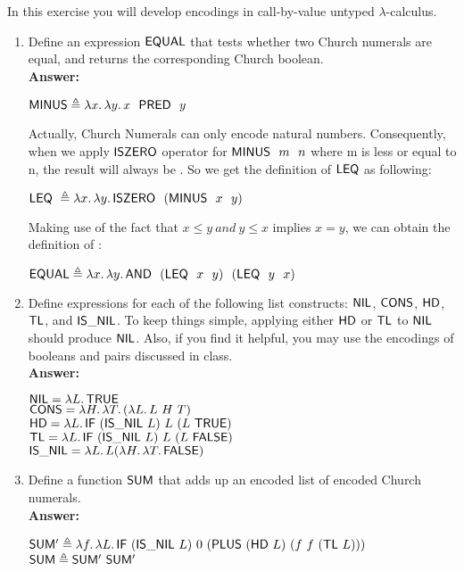 \documentclass[11pt]{article}
\begin{document}
\begin{exercise}
In this exercise you will develop encodings in call-by-value untyped
$\lambda$-calculus.
\begin{enumerate}
\item Define an expression $\mathsf{EQUAL}$ that tests whether two Church numerals 
  are equal, and returns the corresponding Church boolean.\\

\noindent \textbf{Answer:}
\begin{center}
	$\nm{MINUS} \triangleq \lam{x}{\lam{y}{x \ \ \nm{PRED} \ \ y}}$\\
\end{center}
\noindent Actually, Church Numerals can only encode natural numbers. Consequently, when we apply $\mathsf{ISZERO}$ operator for $\mathsf{MINUS} \ \ m \ \ n$ where m is less or equal to n, the result will always be . So we get the definition of $\mathsf{LEQ}$ as following:
\begin{center}
	$\mathsf{LEQ} \ \triangleq \lambda x.\,\lambda y.\,\mathsf{ISZERO} \ \ (\mathsf{MINUS} \ \ x \ \ y)$\\
\end{center}
\noindent Making use of the fact that $x \leq y \ and \ y \leq x$ implies $x = y$, we can obtain the definition of :
\begin{center}
	$\mathsf{EQUAL} \triangleq \lambda x.\,\lambda y.\,\mathsf{AND} \ \ (\mathsf{LEQ} \ \ x \ \ y) \ \ (\mathsf{LEQ} \ \ y \ \ x)$
\end{center}
\item Define expressions for each of the
  following list constructs: $\mathsf{NIL}$, $\mathsf{CONS}$, $\mathsf{HD}$,
  $\mathsf{TL}$, and $\mathsf{IS\_NIL}$. To keep things simple, applying
  either $\mathsf{HD}$ or $\mathsf{TL}$ to $\mathsf{NIL}$ should produce
  $\mathsf{NIL}$. Also, if you find it helpful, you may use the encodings
  of booleans and pairs discussed in class.\\

\noindent \textbf{Answer:}
\begin{center}
	$\mathsf{NIL} = \lambda L.\,\mathsf{TRUE}$\\
	$\mathsf{CONS} = \lambda H.\,\lambda T.\,(\lambda L.\,L~H~T)$\\
	$\mathsf{HD} = \lambda L.\,\mathsf{IF}~(\mathsf{IS\_NIL}~L)~L~(L~\mathsf{TRUE})$\\
	$\mathsf{TL} = \lambda L.\,\mathsf{IF}~(\mathsf{IS\_NIL}~L)~L~(L~\mathsf{FALSE})$\\
	$\mathsf{IS\_NIL} = \lambda L.\,L(\lambda H.\,\lambda T.\,\mathsf{FALSE})$
\end{center}
\item Define a function $\mathsf{SUM}$ that adds up an encoded list of encoded Church
  numerals.\\

\noindent \textbf{Answer:}
\begin{center}
	$\mathsf{SUM'} \triangleq \lambda f.\,\lambda L.\,\mathsf{IF}~(\mathsf{IS\_NIL}~L)~0~(\mathsf{PLUS}~(\mathsf{HD}~L)~(f~f~(\mathsf{TL}~L)))$\\
	$\mathsf{SUM} \triangleq \mathsf{SUM'}~\mathsf{SUM'}$
\end{center}
\end{enumerate}
\end{exercise}
\end{document}
